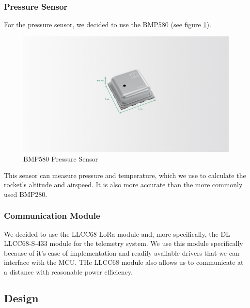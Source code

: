 \documentclass{article}
\begin{document}
\subsubsection*{Pressure Sensor}
For the pressure sensor, we decided to use the BMP580 (see figure \ref{fig:bmp580}).
\begin{figure}[p]
      \caption{BMP580 Pressure Sensor\cite{BMP580}}
      \label{fig:bmp580}
      \centering
      \includegraphics[width=\textwidth]{bmp580.jpg}
\end{figure}This sensor can measure pressure and temperature, which we use to calculate the rocket's altitude and airspeed. It is also more accurate than the more commonly used BMP280.\cite{Bosch_Sensortec_2024}

\subsubsection{Communication Module}
\qquad We decided to use the LLCC68 LoRa module and, more specifically, the DL-LLCC68-S-433 module for the telemetry system. We use this module specifically because of it's ease of implementation and readily available drivers that we can interface with the MCU. THe LLCC68 module also allows us to communicate at a distance with reasonable power efficiency.

\subsection{Design}
\end{document}
